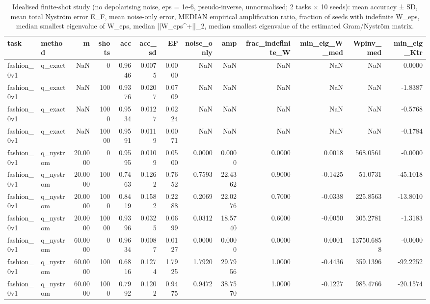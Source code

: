 \begin{table}
\caption{Idealised finite-shot study (no depolarising noise, eps = 1e-6, pseudo-inverse, unnormalised; 2 tasks × 10 seeds): mean accuracy ± SD, mean total Nyström error E_F, mean noise-only error, MEDIAN empirical amplification ratio, fraction of seeds with indefinite W_eps, median smallest eigenvalue of W_eps, median ||W_eps^+||_2, median smallest eigenvalue of the estimated Gram/Nyström matrix.}
\label{tab:table5_noise_shots}
\begin{tabular}{llrrrrrrrrrrr}
\toprule
task & method & m & shots & acc & acc\_sd & EF & noise\_only & amp & frac\_indefinite\_W & min\_eig\_W\_med & Wpinv\_med & min\_eig\_Ktr \\
\midrule
fashion\_0v1 & q\_exact & NaN & 0 & 0.9646 & 0.0075 & 0.0000 & NaN & NaN & NaN & NaN & NaN & 0.0000 \\
fashion\_0v1 & q\_exact & NaN & 100 & 0.9376 & 0.0207 & 0.0709 & NaN & NaN & NaN & NaN & NaN & -1.8387 \\
fashion\_0v1 & q\_exact & NaN & 1000 & 0.9534 & 0.0127 & 0.0224 & NaN & NaN & NaN & NaN & NaN & -0.5768 \\
fashion\_0v1 & q\_exact & NaN & 10000 & 0.9591 & 0.0119 & 0.0071 & NaN & NaN & NaN & NaN & NaN & -0.1784 \\
fashion\_0v1 & q\_nystrom & 20.0000 & 0 & 0.9595 & 0.0109 & 0.0500 & 0.0000 & 0.0000 & 0.0000 & 0.0018 & 568.0561 & -0.0000 \\
fashion\_0v1 & q\_nystrom & 20.0000 & 100 & 0.7463 & 0.1262 & 0.7652 & 0.7593 & 22.4362 & 0.9000 & -0.1425 & 51.0731 & -45.1018 \\
fashion\_0v1 & q\_nystrom & 20.0000 & 1000 & 0.8419 & 0.1582 & 0.2288 & 0.2069 & 22.0276 & 0.7000 & -0.0338 & 225.8563 & -13.8010 \\
fashion\_0v1 & q\_nystrom & 20.0000 & 10000 & 0.9396 & 0.0325 & 0.0699 & 0.0312 & 18.5740 & 0.6000 & -0.0050 & 305.2781 & -1.3183 \\
fashion\_0v1 & q\_nystrom & 60.0000 & 0 & 0.9634 & 0.0087 & 0.0127 & 0.0000 & 0.0000 & 0.0000 & 0.0001 & 13750.6858 & -0.0000 \\
fashion\_0v1 & q\_nystrom & 60.0000 & 100 & 0.6816 & 0.1274 & 1.7925 & 1.7920 & 29.7956 & 1.0000 & -0.4436 & 359.1396 & -92.2252 \\
fashion\_0v1 & q\_nystrom & 60.0000 & 1000 & 0.7992 & 0.1202 & 0.9475 & 0.9472 & 38.7570 & 1.0000 & -0.1227 & 985.4766 & -20.1574 \\

\end{tabular}
\end{table}
